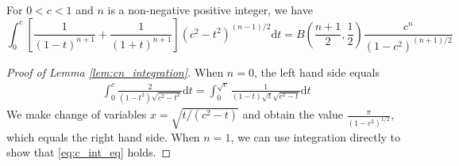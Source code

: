 \documentclass{aptpub}
\def\d{\mathrm{d}}
\begin{document}
\begin{lemma}\label{lem:cn_integration}
For $0<c<1$ and $n$ is a non-negative positive integer, we have
\begin{equation}
    \int_0^{c}
    [\frac{1}{(1-t)^{n+1}}+\frac{1}{(1+t)^{n+1}}]
    (c^2- t^2)^{(n-1)/2}\d t
    =B(\frac{n+1}{2}, \frac{1}{2})
    \frac{c^n}{(1-c^2)^{(n+1)/2}}
    \end{equation}\label{eq:c_int_eq}
\end{lemma}
\begin{proof}[Proof of Lemma \ref{lem:cn_integration}]
     When $n=0$, the left hand side equals
     \begin{align*}
          \int_0^c \frac{2}{(1-t^2)\sqrt{c^2-t^2}} \d t
          = \int_0^{\sqrt{c}} \frac{1}{(1-t) \sqrt{t} \sqrt{c^2-t} }\d t
     \end{align*}     
     We make change of variables $x=\sqrt{t/(c^2-t)}$ and obtain
     the value $\frac{\pi}{(1-c^2)^{1/2}}$, which equals
     the right hand side.
     When $n=1$, we can use integration directly
     to show that \eqref{eq:c_int_eq} holds.


\end{proof}
\end{document}
